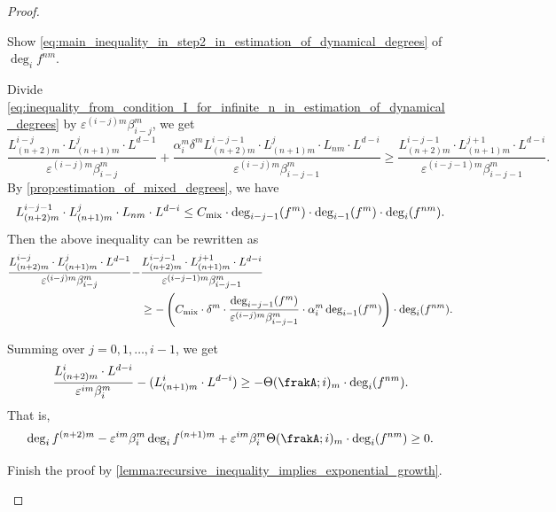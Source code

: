 \begin{proof}
	\begin{step}
		Show \cref{eq:main_inequality_in_step2_in_estimation_of_dynamical_degrees} of $\deg_i f^{nm}$.
	\end{step}

	Divide \cref{eq:inequality_from_condition_I_for_infinite_n_in_estimation_of_dynamical_degrees} by $\varepsilon^{(i-j)m} \beta_{i-j}^m$, we get
	\[
		\frac{L_{(n+2)m}^{i-j} \cdot L_{(n+1)m}^j \cdot L^{d-1}}{\varepsilon^{(i-j)m} \beta_{i-j}^m} + \frac{\alpha_{i}^m \delta^m L_{(n+2)m}^{i-j-1} \cdot L_{(n+1)m}^{j} \cdot L_{nm} \cdot L^{d-i}}{\varepsilon^{(i-j)m} \beta_{i-j-1}^m} \geq \frac{L_{(n+2)m}^{i-j-1} \cdot L_{(n+1)m}^{j+1} \cdot L^{d-i}}{\varepsilon^{(i-j-1)m} \beta_{i-j-1}^m}.
	\]
	By \cref{prop:estimation_of_mixed_degrees}, we have
	\[ L_{(n+2)m}^{i-j-1} \cdot L_{(n+1)m}^{j} \cdot L_{nm} \cdot L^{d-i} \leq C_{\text{mix}} \cdot \deg_{i-j-1}(f^{m}) \cdot \deg_{i-1}(f^{m}) \cdot \deg_i(f^{nm}). \]
	Then the above inequality can be rewritten as
	\begin{equation}\label{eq:inequality_in_estimation_of_dynamical_degrees_define_Theta}
		\begin{aligned}
			\frac{L_{(n+2)m}^{i-j} \cdot L_{(n+1)m}^j \cdot L^{d-1}}{\varepsilon^{(i-j)m} \beta_{i-j}^m} - & \frac{L_{(n+2)m}^{i-j-1} \cdot L_{(n+1)m}^{j+1} \cdot L^{d-i}}{\varepsilon^{(i-j-1)m} \beta_{i-j-1}^m}                                                                         \\
			                                                                                               & \geq - \left( C_{\text{mix}} \cdot \delta^m \cdot \frac{\deg_{i-j-1}(f^{m}) }{\varepsilon^{(i-j)m} \beta_{i-j-1}^m} \cdot \alpha_i^m \deg_{i-1}(f^{m}) \right) \cdot \deg_i(f^{nm}).
		\end{aligned}
	\end{equation}

	Summing over $j = 0, 1, \ldots, i-1$, we get
	\[ \frac{L_{(n+2)m}^i \cdot L^{d-i}}{\varepsilon^{im} \beta_i^m} -  (L_{(n+1)m}^{i} \cdot L^{d-i}) \geq - \Theta(\frakA; i)_m \cdot \deg_i(f^{nm}). \]
	That is,
	\begin{equation}\label{eq:main_inequality_in_step2_in_estimation_of_dynamical_degrees}
		\deg_i f^{(n+2)m} - \varepsilon^{im} \beta_i^m \deg_i f^{(n+1)m} + \varepsilon^{im} \beta_i^m \Theta(\frakA; i)_m \cdot \deg_i(f^{nm}) \geq 0.
	\end{equation}


	\begin{step}
		Finish the proof by \cref{lemma:recursive_inequality_implies_exponential_growth}.
	\end{step}


\end{proof}
